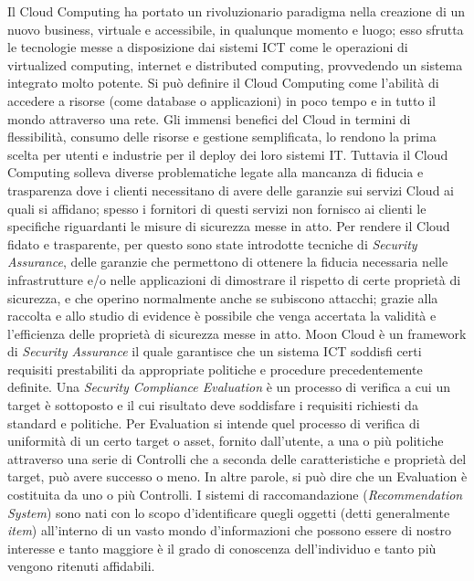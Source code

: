\documentclass[10pt,a4paper]{article}
\begin{document}
\hfill\break
Il Cloud Computing ha portato un rivoluzionario paradigma nella creazione di un nuovo business, virtuale e accessibile, 
in qualunque momento e luogo; esso sfrutta le tecnologie messe a disposizione dai sistemi ICT come le operazioni di virtualized computing, 
internet e distributed computing, provvedendo un sistema integrato molto potente. Si può definire il Cloud Computing come l'abilità di accedere a 
risorse (come database o applicazioni) in poco tempo e in tutto il mondo attraverso una rete.\hfill\break
Gli immensi benefici del Cloud in termini di flessibilità, consumo delle risorse e gestione semplificata, lo rendono la prima scelta per 
utenti e industrie per il deploy dei loro sistemi IT. Tuttavia il Cloud Computing solleva diverse problematiche legate alla mancanza di 
fiducia e trasparenza dove i clienti necessitano di avere delle garanzie sui servizi Cloud ai quali si affidano; spesso i fornitori di 
questi servizi non fornisco ai clienti le specifiche riguardanti le misure di sicurezza messe in atto.\hfill\break
Per rendere il Cloud fidato e trasparente, per questo sono state introdotte tecniche di \textit{Security Assurance}, delle garanzie che 
permettono di ottenere la fiducia necessaria nelle infrastrutture e/o nelle applicazioni di dimostrare il rispetto di certe proprietà 
di sicurezza, e che operino normalmente anche se subiscono attacchi; grazie alla raccolta e allo studio di evidence è possibile che 
venga accertata la validità e l'efficienza delle proprietà di sicurezza messe in atto.\hfill\break
Moon Cloud è un framework di \textit{Security Assurance} il quale garantisce che un sistema ICT soddisfi certi requisiti 
prestabiliti da appropriate politiche e procedure precedentemente definite. Una \textit{Security Compliance Evaluation} è un processo di 
verifica a cui un target è sottoposto e il cui risultato deve soddisfare i requisiti richiesti da standard e politiche. 
Per Evaluation si intende quel processo di verifica di uniformità di un certo target o asset, fornito dall'utente, a una o più politiche 
attraverso una serie di Controlli che a seconda delle caratteristiche e proprietà del target, può avere successo o meno. In altre parole, 
si può dire che un Evaluation è costituita da uno o più Controlli. 
I sistemi di raccomandazione (\textit{Recommendation System}) sono nati con lo scopo d'identificare quegli oggetti (detti generalmente \textit{item}) 
all'interno di un vasto mondo d'informazioni che possono essere di nostro interesse e tanto maggiore è il grado di conoscenza dell'individuo 
e tanto più vengono ritenuti affidabili.\hfill\break
\end{document}
